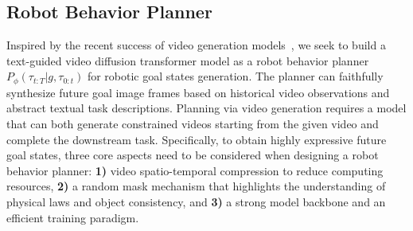 \subsection{Robot Behavior Planner} \label{subsection:Robot Behavior Planner}
Inspired by the recent success of video generation models~\citep{videoworldsimulators2024,esser2024scaling}, we seek to build a text-guided video diffusion transformer model as a robot behavior planner $P_{\phi}(\tau_{t:T}|g, \tau_{0:t})$ for robotic goal states generation. 
The planner can faithfully synthesize future goal image frames based on historical video observations and abstract textual task descriptions. 
Planning via video generation requires a model that can both generate constrained videos starting from the given video and complete the downstream task.
Specifically, to obtain highly expressive future goal states, three core aspects need to be considered when designing a robot behavior planner: \textbf{1)} video spatio-temporal compression to reduce computing resources, \textbf{2)} a random mask mechanism that highlights the understanding of physical laws and object consistency, and \textbf{3)} a strong model backbone and an efficient training paradigm.

